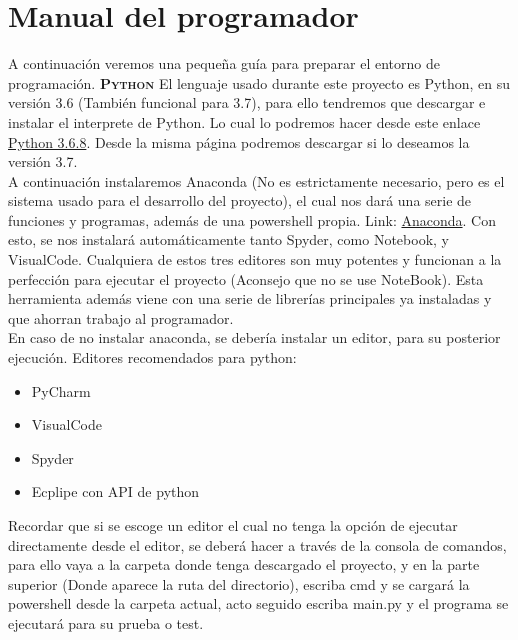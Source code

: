 \section{Manual del programador}
A continuación veremos una pequeña guía para preparar el entorno de programación.
\textbf{\textsc{Python}}
El lenguaje usado durante este proyecto es Python, en su versión 3.6 (También funcional para 3.7), para ello tendremos que descargar e instalar el interprete de Python. Lo cual lo podremos hacer desde este enlace \href{https://www.python.org/downloads/release/python-368/}{Python 3.6.8}. Desde la misma página podremos descargar si lo deseamos la versión 3.7.\\
A continuación instalaremos Anaconda (No es estrictamente necesario, pero es el sistema usado para el desarrollo del proyecto), el cual nos dará una serie de funciones y programas, además de una powershell propia. Link: \href{https://www.anaconda.com/distribution/}{Anaconda}. Con esto, se nos instalará automáticamente tanto Spyder, como Notebook, y VisualCode. Cualquiera de estos tres editores son muy potentes y funcionan a la perfección para ejecutar el proyecto (Aconsejo que no se use NoteBook). Esta herramienta además viene con una serie de librerías principales ya instaladas y que ahorran trabajo al programador.\\
En caso de no instalar anaconda, se debería instalar un editor, para su posterior ejecución. Editores recomendados para python:
\begin{itemize}
\item PyCharm
\item VisualCode
\item Spyder
\item Ecplipe con API de python
\end{itemize}
Recordar que si se escoge un editor el cual no tenga la opción de ejecutar directamente desde el editor, se deberá hacer a través de la consola de comandos, para ello vaya a la carpeta donde tenga descargado el proyecto, y en la parte superior (Donde aparece la ruta del directorio), escriba cmd y se cargará la powershell desde la carpeta actual, acto seguido escriba main.py y el programa se ejecutará para su prueba o test.\\

